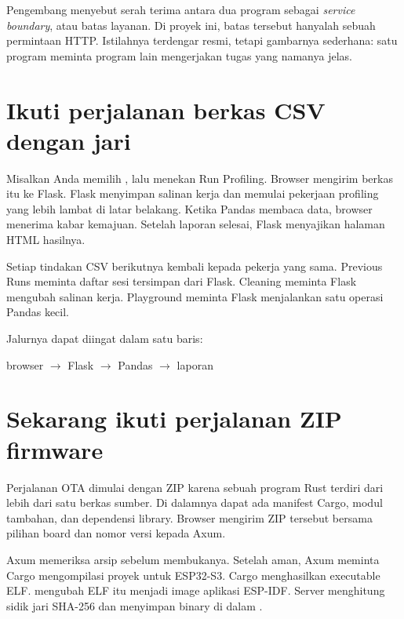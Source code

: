 \begin{mentorbox}
Pengembang menyebut serah terima antara dua program sebagai \emph{service boundary}, atau batas layanan. Di proyek ini, batas tersebut hanyalah sebuah permintaan HTTP. Istilahnya terdengar resmi, tetapi gambarnya sederhana: satu program meminta program lain mengerjakan tugas yang namanya jelas.
\end{mentorbox}

\section{Ikuti perjalanan berkas CSV dengan jari}

Misalkan Anda memilih , lalu menekan Run Profiling. Browser mengirim berkas itu ke Flask. Flask menyimpan salinan kerja dan memulai pekerjaan profiling yang lebih lambat di latar belakang. Ketika Pandas membaca data, browser menerima kabar kemajuan. Setelah laporan selesai, Flask menyajikan halaman HTML hasilnya.

Setiap tindakan CSV berikutnya kembali kepada pekerja yang sama. Previous Runs meminta daftar sesi tersimpan dari Flask. Cleaning meminta Flask mengubah salinan kerja. Playground meminta Flask menjalankan satu operasi Pandas kecil.

Jalurnya dapat diingat dalam satu baris:

\begin{center}
\ttfamily browser $\rightarrow$ Flask $\rightarrow$ Pandas $\rightarrow$ laporan
\end{center}

\section{Sekarang ikuti perjalanan ZIP firmware}

Perjalanan OTA dimulai dengan ZIP karena sebuah program Rust terdiri dari lebih dari satu berkas sumber. Di dalamnya dapat ada manifest Cargo, modul tambahan, dan dependensi library. Browser mengirim ZIP tersebut bersama pilihan board dan nomor versi kepada Axum.

Axum memeriksa arsip sebelum membukanya. Setelah aman, Axum meminta Cargo mengompilasi proyek untuk ESP32-S3. Cargo menghasilkan executable ELF.  mengubah ELF itu menjadi image aplikasi ESP-IDF. Server menghitung sidik jari SHA-256 dan menyimpan binary di dalam .

